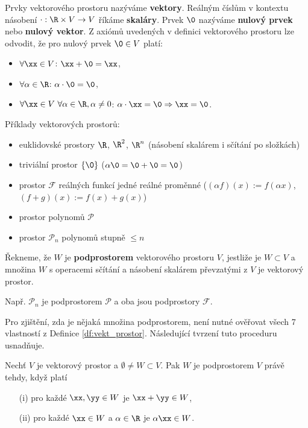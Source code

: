 Prvky vektorového prostoru nazýváme {\bf vektory}.
Reálným číslům v kontextu násobení $\cdot:\R\times V\to V$ říkáme {\bf skaláry}.
Prvek $\0$ nazýváme {\bf nulový prvek} nebo {\bf nulový vektor}.
% 
Z axiómů uvedených v definici vektorového prostoru lze odvodit, že pro nulový prvek $\0\in V$ platí:
\begin{itemize}
\item $\forall\xx\in V$: $\xx+\0=\xx$,
\item $\forall\alpha\in\R$: $\alpha\cdot\0=\0$,
\item $\forall\xx\in V~\forall\alpha\in\R,\alpha\neq 0$: $\alpha\cdot\xx=\0\Rightarrow\xx=\0$.
\end{itemize}
% 
% 
Příklady vektorových prostorů:
\begin{itemize}
\item euklidovské prostory $\R$, $\R^2$, $\R^n$ (násobení skalárem i sčítání po složkách)
\item triviální prostor $\{\0\}$ ($\alpha\0=\0+\0=\0$)
\item prostor $\mathcal F$ reálných funkcí jedné reálné proměnné ($(\alpha f)(x):=f(\alpha x)$, $(f+g)(x):=f(x)+g(x)$)
\item prostor polynomů $\mathcal P$
\item prostor $\mathcal P_n$ polynomů stupně $\le n$
\end{itemize}

\begin{df}
Řekneme, že $W$ je {\bf podprostorem} vektorového prostoru $V$, jestliže je $W\subset V$ a množina $W$ s operacemi sčítání a násobení skalárem převzatými z $V$ je vektorový prostor.
\end{df}
Např. $\mathcal P_n$ je podprostorem $\mathcal P$ a oba jsou podprostory $\mathcal F$.

Pro zjištění, zda je nějaká množina podprostorem, není nutné ověřovat všech 7 vlastností z Definice \ref{df:vekt_prostor}.
Následující tvrzení tuto proceduru usnadňuje.
\begin{veta}
Nechť $V$ je vektorový prostor a $\emptyset\neq W\subset V$.
Pak $W$ je podprostorem $V$ právě tehdy, když platí
\begin{itemize}
\item[(i)] pro každé $\xx,\yy\in W$ je $\xx+\yy\in W$,
\item[(ii)] pro každé $\xx\in W$ a $\alpha\in\R$ je $\alpha\xx\in W$.
\end{itemize}
\end{veta}

